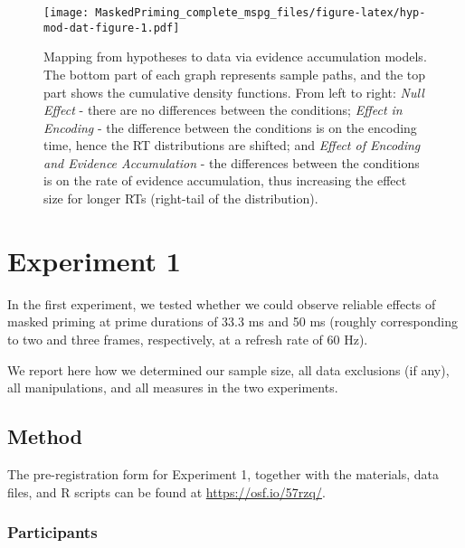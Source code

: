 \documentclass[
  english,
  man,floatsintext]{apa6}
\begin{document}
\newpage

\begin{figure}
\centering
\texttt{[image: MaskedPriming\_complete\_mspg\_files/figure-latex/hyp-mod-dat-figure-1.pdf]}
\caption{\label{fig:hyp-mod-dat-figure}Mapping from hypotheses to data via evidence accumulation models. The bottom part of each graph represents sample paths, and the top part shows the cumulative density functions. From left to right: \emph{Null Effect} - there are no differences between the conditions; \emph{Effect in Encoding} - the difference between the conditions is on the encoding time, hence the RT distributions are shifted; and \emph{Effect of Encoding and Evidence Accumulation} - the differences between the conditions is on the rate of evidence accumulation, thus increasing the effect size for longer RTs (right-tail of the distribution).}
\end{figure}

\hypertarget{experiment-1}{%
\section{Experiment 1}\label{experiment-1}}

In the first experiment, we tested whether we could observe reliable effects of masked priming at prime durations of 33.3 ms and 50 ms (roughly corresponding to two and three frames, respectively, at a refresh rate of 60 Hz).

We report here how we determined our sample size, all data exclusions (if any), all manipulations, and all measures in the two experiments.

\hypertarget{method}{%
\subsection{Method}\label{method}}

The pre-registration form for Experiment 1, together with the materials, data files, and R scripts can be found at \url{https://osf.io/57rzq/}.

\hypertarget{participants}{%
\subsubsection{Participants}\label{participants}}
\end{document}
